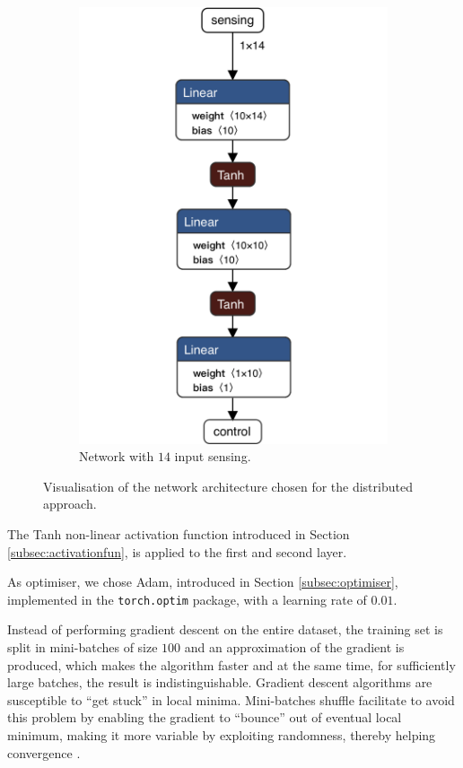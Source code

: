 \begin{figure}[htb]
\begin{subfigure}[h]{0.495\textwidth}
		\includegraphics[width=.8\textwidth]{contents/images/task1distributed_all@4x}
		\caption{Network with $14$ input sensing.}
		\label{fig:singlenet-d14distributed1}
	\end{subfigure}
	\caption[Network architectures for the distributed approach.]{Visualisation of 
		the network architecture chosen for the distributed approach.}
	\label{fig:singlenetdistributed1}
\end{figure}

The Tanh non-linear activation function introduced in Section 
\ref{subsec:activationfun}, is applied to the first and second layer. 

As optimiser, we chose Adam, introduced in Section \ref{subsec:optimiser}, 
implemented in the \texttt{torch.optim} package, with a learning rate of $0.01$. 

Instead of performing gradient descent on the entire dataset, the training set is 
split in mini-batches of size $100$ and an approximation of the gradient is 
produced, which makes the algorithm faster and at the same time, for sufficiently 
large batches, the result is indistinguishable.
Gradient descent algorithms are susceptible to ``get stuck'' in local minima.
Mini-batches shuffle facilitate to avoid this problem by enabling the gradient to 
``bounce'' out of eventual local minimum, making it more variable by exploiting 
randomness, thereby helping convergence \cite[][]{meng2019convergence}.

